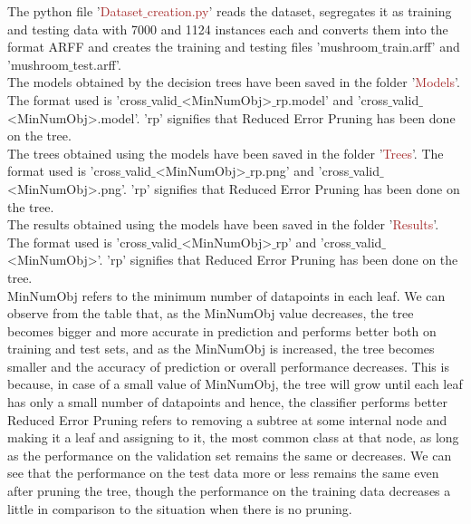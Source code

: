 \documentclass[paper=a4, fontsize=11pt]{scrartcl}
\numberwithin{equation}{section}		%
\numberwithin{figure}{section}			%
\numberwithin{table}{section}				%
\begin{document}
The python file '\textcolor{Brown}{Dataset$\_$creation.py}' reads the dataset, segregates it as training and testing data with 7000 and 1124 instances each and converts them into the format ARFF and creates the training and testing files 'mushroom$\_$train.arff' and 'mushroom$\_$test.arff'. \\

The models obtained by the decision trees have been saved in the folder '\textcolor{Brown}{Models}'. The format used is 'cross$\_$valid$\_$<MinNumObj>$\_$rp.model' and 'cross$\_$valid$\_$<MinNumObj>.model'. 'rp' signifies that Reduced Error Pruning has been done on the tree. \\

The trees obtained using the models have been saved in the folder '\textcolor{Brown}{Trees}'. The format used is 'cross$\_$valid$\_$<MinNumObj>$\_$rp.png' and 'cross$\_$valid$\_$<MinNumObj>.png'. 'rp' signifies that Reduced Error Pruning has been done on the tree. \\

The results obtained using the models have been saved in the folder '\textcolor{Brown}{Results}'. The format used is 'cross$\_$valid$\_$<MinNumObj>$\_$rp' and 'cross$\_$valid$\_$<MinNumObj>'. 'rp' signifies that Reduced Error Pruning has been done on the tree. \\

MinNumObj refers to the minimum number of datapoints in each leaf. We can observe from the table that, as the MinNumObj value decreases, the tree becomes bigger and more accurate in prediction and performs better both on training and test sets, and as the MinNumObj is increased, the tree becomes smaller and the accuracy of prediction or overall performance decreases. This is because, in case of a small value of MinNumObj, the tree will grow until each leaf has only a small number of datapoints and hence, the classifier performs better \\

Reduced Error Pruning refers to removing a subtree at some internal node and making it a leaf and assigning to it, the most common class at that node, as long as the performance on the validation set remains the same or decreases. We can see that the performance on the test data more or less remains the same even after pruning the tree, though the performance on the training data decreases a little in comparison to the situation when there is no pruning.\\
\end{document}
